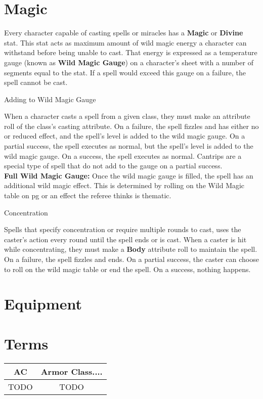 \documentclass[18pt]{article}
\begin{document}
\begin{multicols}{2}
\section*{Magic}
\label{section:GenMagicRules}
Every character capable of casting spells or miracles has a \textbf{Magic} or \textbf{Divine} stat. This stat acts as maximum amount of wild magic energy a character can withstand before being unable to cast. That energy is expressed as a temperature gauge (known as \textbf{Wild Magic Gauge}) on a character's sheet with a number of segments equal to the stat. If a spell would exceed this gauge on a failure, the spell cannot be cast.
\begin{mercHeading}
{Adding to Wild Magic Gauge}
\end{mercHeading}
When a character casts a spell from a given class, they must make an attribute roll of the class's casting attribute. On a failure, the spell fizzles and has either no or reduced effect, and the spell's level is added to the wild magic gauge. On a partial success, the spell executes as normal, but the spell's level is added to the wild magic gauge. On a success, the spell executes as normal. Cantrips are a special type of spell that do not add to the gauge on a partial success.\vspace{2pt}\\
  \textbf{Full Wild Magic Gauge:}
Once the wild magic gauge is filled, the spell has an additional wild magic effect. This is determined by rolling on the Wild Magic table on pg \pageref{table:WildMagic} or an effect the referee thinks is thematic.
\begin{mercHeading}
Concentration
\end{mercHeading}
Spells that specify concentration or require multiple rounds to cast, uses the caster's action every round until the spell ends or is cast. When a caster is hit while concentrating, they must make a \textbf{Body} attribute roll to maintain the spell. On a failure, the spell fizzles and ends. On a partial success, the caster can choose to roll on the wild magic table or end the spell. On a success, nothing happens.

\section*{Equipment}
\label{section:Equipment}
\end{multicols}
\appendix
\section*{Terms}
\begin{tabular}{|c |c|}
\hline
AC & Armor Class.... \\
\hline
TODO & TODO \\
\hline
\end{tabular}
\end{document}
